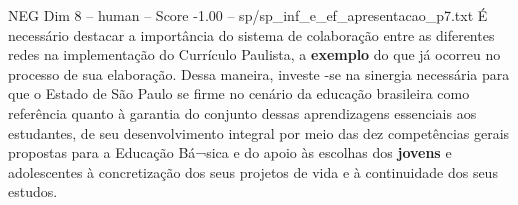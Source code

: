 \begin{textsample}{NEG Dim 8 – human – Score -1.00 – sp/sp\_inf\_e\_ef\_apresentacao\_p7.txt}  \label{ex:f8_neg_013}
É necessário destacar a importância do sistema de colaboração entre as diferentes redes na implementação do Currículo Paulista, a \textbf{exemplo} do que já ocorreu no processo de sua elaboração.
Dessa maneira, investe -se na sinergia necessária para que o Estado de São Paulo se firme no cenário da educação brasileira como referência quanto à garantia do conjunto dessas aprendizagens essenciais aos estudantes, de seu desenvolvimento integral por meio das dez competências gerais propostas para a Educação Bá¬sica e do apoio às escolhas dos \textbf{jovens} e adolescentes à concretização dos seus projetos de vida e à continuidade dos seus estudos.

\end{textsample}
